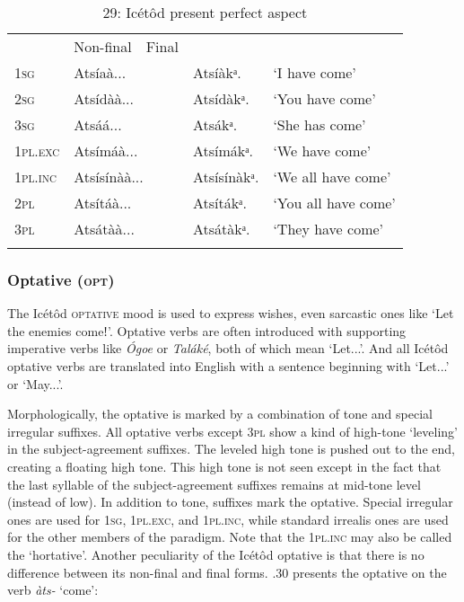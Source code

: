 \begin{table}
\begin{table}
\caption{29: Icétôd present perfect aspect}
\label{tab:8}


\begin{tabularx}{\textwidth}{XXXXX}
\lsptoprule

\multicolumn{2}{X}{} & Non-final & Final & \\
\textsc{1sg} & \multicolumn{2}{X}{Atsíaà...} & Atsíàkᵃ. & ‘I have come’\\
\textsc{2sg} & \multicolumn{2}{X}{Atsídàà...} & Atsídàkᵃ. & ‘You have come’\\
\textsc{3sg} & \multicolumn{2}{X}{Atsáá...} & Atsákᵃ. & ‘She has come’\\
\textsc{1pl.exc} & \multicolumn{2}{X}{Atsímáà...} & Atsímákᵃ. & ‘We have come’\\
\textsc{1pl.inc} & \multicolumn{2}{X}{Atsísínàà...} & Atsísínàkᵃ. & ‘We all have come’\\
\textsc{2pl} & \multicolumn{2}{X}{Atsítáà...} & Atsítákᵃ. & ‘You all have come’\\
\textsc{3pl} & \multicolumn{2}{X}{Atsátàà...} & Atsátàkᵃ. & ‘They have come’\\
\lspbottomrule
\end{tabularx}
\end{table}

\subsubsection{Optative (\textsc{opt})}

The Icétôd \textsc{optative} mood is used to express wishes, even sarcastic ones like ‘Let the enemies comeǃ’. Optative verbs are often introduced with supporting imperative verbs like \textit{\'{O}goe} or \textit{Taláké}, both of which mean ‘Let...’. And all Icétôd optative verbs are translated into English with a sentence beginning with ‘Let...’ or ‘May...’. 

Morphologically, the optative is marked by a combination of tone and special irregular suffixes. All optative verbs except 3\textsc{pl} show a kind of high-tone ‘leveling’ in the subject-agreement suffixes. The leveled high tone is pushed out to the end, creating a floating high tone. This high tone is not seen except in the fact that the last syllable of the subject-agreement suffixes remains at mid-tone level (instead of low). In addition to tone, suffixes mark the optative. Special irregular ones are used for \textsc{1sg}, 1\textsc{pl.exc}, and 1\textsc{pl.inc}, while standard irrealis ones are used for the other members of the paradigm. Note that the 1\textsc{pl.inc }may also be called the ‘hortative’. Another peculiarity of the Icétôd optative is that there is no difference between its non-final and final forms. .30 presents the optative on the verb \textit{àts- }‘come’:



\end{table}
